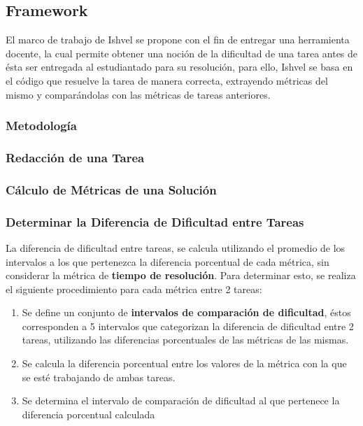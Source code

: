 \documentclass[letterpaper,12pt]{article}
\begin{document}
\subsection{Framework}

El marco de trabajo de Ishvel se propone con el fin de entregar una herramienta docente, la cual permite obtener una noción de la dificultad de una tarea antes de ésta ser entregada al estudiantado para su resolución, para ello, Ishvel se basa en el código que resuelve la tarea de manera correcta, extrayendo métricas del mismo y comparándolas con las métricas de tareas anteriores.

\subsubsection{Metodología}



\subsubsection{Redacción de una Tarea}
\subsubsection{Cálculo de Métricas de una Solución}

\subsubsection{Determinar la Diferencia de Dificultad entre Tareas}

La diferencia de dificultad entre tareas, se calcula utilizando el promedio de los intervalos a los que pertenezca la diferencia porcentual de cada métrica, sin considerar la métrica de \textbf{tiempo de resolución}. Para determinar esto, se realiza el siguiente procedimiento para cada métrica entre 2 tareas:

\begin{enumerate}
  \item Se define un conjunto de \textbf{intervalos de comparación de dificultad}, éstos corresponden a 5 intervalos que categorizan la diferencia de dificultad entre 2 tareas, utilizando las diferencias porcentuales de las métricas de las mismas.
  \item Se calcula la diferencia porcentual entre los valores de la métrica con la que se esté trabajando de ambas tareas.
  \item Se determina el intervalo de comparación de dificultad al que pertenece la diferencia porcentual calculada
\end{enumerate}
\end{document}
